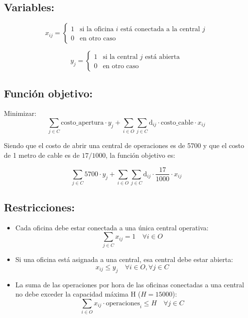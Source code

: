 \documentclass{article}
\begin{document}
\vspace{0.5cm}

\subsection*{Variables:}
\[
x_{ij} = 
\begin{cases} 
1 & \text{si la oficina } i \text{ está conectada a la central } j \\ 
0 & \text{en otro caso}
\end{cases}
\]

\vspace{0.5cm}

\[
y_{j}= 
\begin{cases} 
1 & \text{si la central } j \text{ está abierta} \\ 
0 & \text{en otro caso}
\end{cases}
\]

\subsection*{Función objetivo:}

Minimizar:
\[
\sum_{j \in C} \text{costo\_apertura} \cdot y_j + \sum_{i \in O} \sum_{j \in C} \text{d}_{ij} \cdot \text{costo\_cable} \cdot x_{ij}
\]

Siendo que el costo de abrir una central de operaciones es de 5700 y que el costo de 1 metro de cable es de \(17/1000\), la función objetivo es:

\[
\sum_{j \in C} 5700 \cdot y_j + \sum_{i \in O} \sum_{j \in C} \text{d}_{ij} \cdot \frac{17}{1000} \cdot x_{ij}
\]

\subsection*{Restricciones:}

\begin{itemize}
    \item Cada oficina debe estar conectada a una única central operativa:
    \[
    \sum_{j \in C} x_{ij} = 1 \quad \forall i \in O
    \]
    
    \item Si una oficina está asignada a una central, esa central debe estar abierta:
    \[
    x_{ij} \leq y_j \quad \forall i \in O, \forall j \in C
    \]

    \item La suma de las operaciones por hora de las oficinas conectadas a una central no debe exceder la capacidad máxima H (\(H = 15000\)):
    \[
    \sum_{i \in O} x_{ij} \cdot \text{operaciones}_i \leq H \quad \forall j \in C
    \]
\end{itemize}
\end{document}
